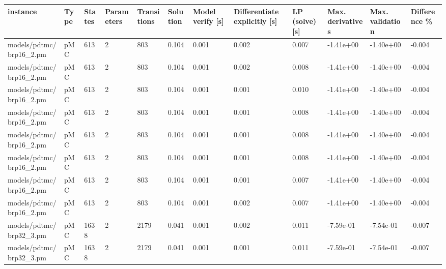 \begin{tabular}{llllllllllll}
\toprule
               instance & Type & States & Parameters & Transitions & Solution & Model verify [s] & Differentiate explicitly [s] & LP (solve) [s] & Max. derivatives & Max. validation & Difference \% \\
\midrule
models/pdtmc/brp16\_2.pm &  pMC &    613 &          2 &         803 &    0.104 &            0.001 &                        0.002 &          0.007 &        -1.41e+00 &       -1.40e+00 &       -0.004 \\
models/pdtmc/brp16\_2.pm &  pMC &    613 &          2 &         803 &    0.104 &            0.001 &                        0.002 &          0.008 &        -1.41e+00 &       -1.40e+00 &       -0.004 \\
models/pdtmc/brp16\_2.pm &  pMC &    613 &          2 &         803 &    0.104 &            0.001 &                        0.001 &          0.010 &        -1.41e+00 &       -1.40e+00 &       -0.004 \\
models/pdtmc/brp16\_2.pm &  pMC &    613 &          2 &         803 &    0.104 &            0.001 &                        0.001 &          0.008 &        -1.41e+00 &       -1.40e+00 &       -0.004 \\
models/pdtmc/brp16\_2.pm &  pMC &    613 &          2 &         803 &    0.104 &            0.001 &                        0.001 &          0.008 &        -1.41e+00 &       -1.40e+00 &       -0.004 \\
models/pdtmc/brp16\_2.pm &  pMC &    613 &          2 &         803 &    0.104 &            0.001 &                        0.001 &          0.008 &        -1.41e+00 &       -1.40e+00 &       -0.004 \\
models/pdtmc/brp16\_2.pm &  pMC &    613 &          2 &         803 &    0.104 &            0.001 &                        0.001 &          0.007 &        -1.41e+00 &       -1.40e+00 &       -0.004 \\
models/pdtmc/brp16\_2.pm &  pMC &    613 &          2 &         803 &    0.104 &            0.001 &                        0.002 &          0.007 &        -1.41e+00 &       -1.40e+00 &       -0.004 \\
models/pdtmc/brp32\_3.pm &  pMC &   1638 &          2 &        2179 &    0.041 &            0.001 &                        0.002 &          0.011 &        -7.59e-01 &       -7.54e-01 &       -0.007 \\
models/pdtmc/brp32\_3.pm &  pMC &   1638 &          2 &        2179 &    0.041 &            0.001 &                        0.001 &          0.011 &        -7.59e-01 &       -7.54e-01 &       -0.007 \\

\end{tabular}
